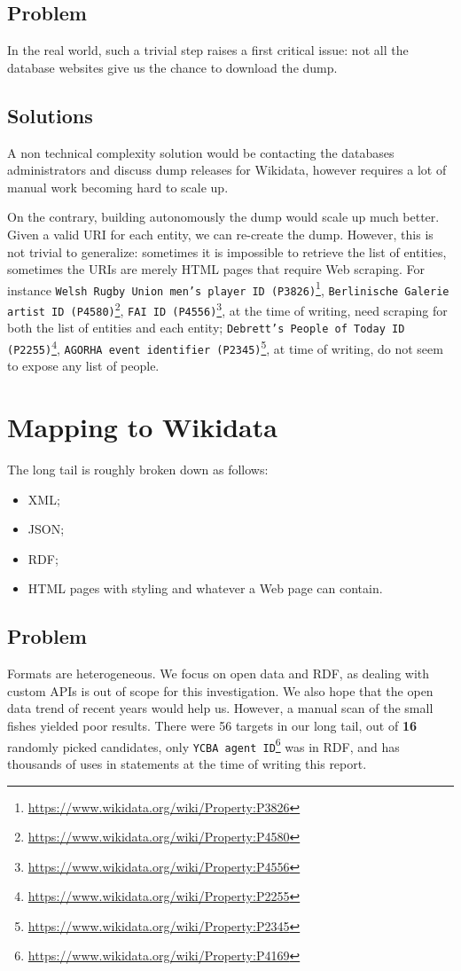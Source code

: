 \subsection{Problem}
\label{cha:311}
In the real world, such a trivial step raises a first critical issue: not all the database websites give us the chance to download the dump.

\subsection{Solutions}
\label{cha:312}
A non technical complexity solution would be contacting the databases administrators and discuss dump releases for Wikidata, however requires a lot of manual work becoming hard to scale up.

On the contrary, building autonomously the dump would scale up much better. Given a valid URI for each entity, we can re-create the dump. However, this is not trivial to generalize: sometimes it is impossible to retrieve the list of entities, sometimes the URIs are merely HTML pages that require Web scraping. For instance \texttt{Welsh Rugby Union men's player ID (P3826)}\footnote{\url{https://www.wikidata.org/wiki/Property:P3826}}, \texttt{Berlinische Galerie artist ID (P4580)}\footnote{\url{https://www.wikidata.org/wiki/Property:P4580}}, \texttt{FAI ID (P4556)}\footnote{\url{https://www.wikidata.org/wiki/Property:P4556}}, at the time of writing, need scraping for both the list of entities and each entity; \texttt{Debrett's People of Today ID (P2255)}\footnote{\url{https://www.wikidata.org/wiki/Property:P2255}}, \texttt{AGORHA event identifier (P2345)}\footnote{\url{https://www.wikidata.org/wiki/Property:P2345}}, at time of writing, do not seem to expose any list of people.

\section{Mapping to Wikidata}
\label{cha:32}
The long tail is roughly broken down as follows:
\begin{itemize}
    \item XML;
    \item JSON;
    \item RDF;
    \item HTML pages with styling and whatever a Web page can contain.
\end{itemize}

\subsection{Problem}
\label{cha:321}
Formats are heterogeneous. We focus on open data and RDF, as dealing with custom APIs is out of scope for this investigation. We also hope that the open data trend of recent years would help us. However, a manual scan of the small fishes yielded poor results. There were 56 targets in our long tail, out of \textbf{16} randomly picked candidates, only \texttt{YCBA agent ID}\footnote{\url{https://www.wikidata.org/wiki/Property:P4169}} was in RDF, and has thousands of uses in statements at the time of writing this report.
